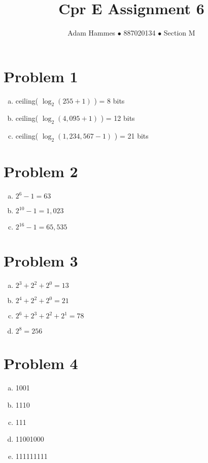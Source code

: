 \documentclass[11pt]{article}
\begin{document}
\title{Cpr E Assignment 6}
\author{Adam Hammes $\bullet$ 887020134 $\bullet$ Section M}
\maketitle

\section*{Problem 1}
\begin{enumerate}[(a)]
	\item ceiling( $\log _2 (255+1)$ ) = 8 bits
	\item ceiling( $\log _2 (4,095+1)$ ) = 12 bits
	\item ceiling( $\log _2 (1,234,567-1)$ ) = 21 bits
\end{enumerate}

\section*{Problem 2}
\begin{enumerate}[(a)]
	\item $2^6 -1 = 63$
	\item $2^{10} -1 = 1,023$
	\item $2^{16}-1 = 65,535$
\end{enumerate}

\section*{Problem 3}
\begin{enumerate}[(a)]
	\item $2^3+ 2^2+2^0=13$
	\item $2^4+2^2+2^0 =21$
	\item $2^6 + 2^3 + 2^2 +2^1 =78$
	\item $2^8 =256$
\end{enumerate}

\section*{Problem 4}
\begin{enumerate}[(a)]
	\item 1001
	\item 1110
	\item 111
	\item 11001000
	\item 111111111
\end{enumerate}
\end{document}
